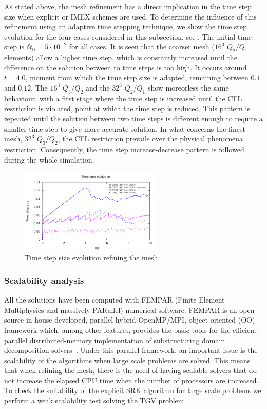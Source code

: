 As stated above, the mesh refinement has a direct implication in the time step size when explicit or IMEX schemes are used. To determine the influence of this refinement using an adaptive time stepping technique, we show the time step evolution for the four cases considered in this subsection, see . The initial time step is $ \delta t_0=5\cdot10^{-2} $ for all cases. It is seen that the coarser mesh ($ 16^3 $ $ Q_2/Q_1 $ elements) allow a higher time step, which is constantly increased until the difference on the solution between to time steps is too high. It occurs around $ t=4.0 $, moment from which the time step size is adapted, remaining between $ 0.1 $ and $ 0.12 $. The $ 16^3 $ $ Q_3/Q_2 $ and the $ 32^3 $ $ Q_2/Q_1 $ show moreorless the same behaviour, with a first stage where the time step is increased until the CFL restriction is violated, point at which the time step is reduced. This pattern is repeated until the solution between two time steps is different enough to require a smaller time step to give more accurate solution. In what concerns the finest mesh, $ 32^3 $ $ Q_3/Q_2 $, the CFL restriction prevails over the physical phenomena restriction. Consequently, the time step increase-decrease pattern is followed during the whole simulation.
\begin{figure}[h!]
  \centering
  \includegraphics[width=0.6\textwidth]{Figures/Chapter7/TGV/refinement_dtime}
  \caption{Time step size evolution refining the mesh}
  \label{fig-TGV_SRK_tim}
\end{figure}

\subsubsection{Scalability analysis}
All the solutions have been computed with FEMPAR (Finite Element Multiphysics and massively PARallel) numerical software. FEMPAR is an open source in-house developed, parallel hybrid OpenMP/MPI, object-oriented (OO) framework which, among other features, provides the basic tools for the efficient parallel distributed-memory implementation  of substructuring domain decomposition solvers~\cite{badia_implementation_2013,badia_highly_2014}. Under this parallel framework, an important issue is the scalability of the algorithms when large scale problems are solved. This means that when refining the mesh, there is the need of having scalable solvers that do not increase the elapsed CPU time when the number of processors are increased. To check the suitability of the explicit SRK algorithm for large scale problems we perform a weak scalability test solving the TGV problem. 

